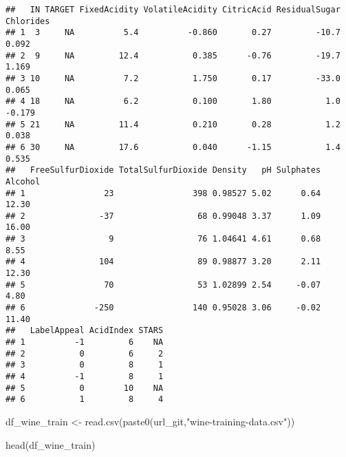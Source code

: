 \documentclass[
]{article}
\newenvironment{Shaded}{\begin{snugshade}}{\end{snugshade}}
\newcommand{\FunctionTok}[1]{\textcolor[rgb]{0.00,0.00,0.00}{#1}}
\newcommand{\NormalTok}[1]{#1}
\newcommand{\OtherTok}[1]{\textcolor[rgb]{0.56,0.35,0.01}{#1}}
\newcommand{\StringTok}[1]{\textcolor[rgb]{0.31,0.60,0.02}{#1}}
\begin{document}
\begin{verbatim}
##   IN TARGET FixedAcidity VolatileAcidity CitricAcid ResidualSugar Chlorides
## 1  3     NA          5.4          -0.860       0.27         -10.7     0.092
## 2  9     NA         12.4           0.385      -0.76         -19.7     1.169
## 3 10     NA          7.2           1.750       0.17         -33.0     0.065
## 4 18     NA          6.2           0.100       1.80           1.0    -0.179
## 5 21     NA         11.4           0.210       0.28           1.2     0.038
## 6 30     NA         17.6           0.040      -1.15           1.4     0.535
##   FreeSulfurDioxide TotalSulfurDioxide Density   pH Sulphates Alcohol
## 1                23                398 0.98527 5.02      0.64   12.30
## 2               -37                 68 0.99048 3.37      1.09   16.00
## 3                 9                 76 1.04641 4.61      0.68    8.55
## 4               104                 89 0.98877 3.20      2.11   12.30
## 5                70                 53 1.02899 2.54     -0.07    4.80
## 6              -250                140 0.95028 3.06     -0.02   11.40
##   LabelAppeal AcidIndex STARS
## 1          -1         6    NA
## 2           0         6     2
## 3           0         8     1
## 4          -1         8     1
## 5           0        10    NA
## 6           1         8     4
\end{verbatim}

\begin{Shaded}
\begin{Highlighting}[]
\NormalTok{df\_wine\_train }\OtherTok{\textless{}{-}} 
  \FunctionTok{read.csv}\NormalTok{(}\FunctionTok{paste0}\NormalTok{(url\_git,}\StringTok{"wine{-}training{-}data.csv"}\NormalTok{))}

\FunctionTok{head}\NormalTok{(df\_wine\_train)}
\end{Highlighting}
\end{Shaded}
\end{document}
